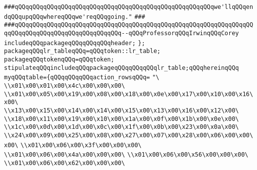 \verb|###qQQqqQQqqQQqqQQqqQQqqQQqqQQqqQQqqQQqqQQqqQQqqQQqqQQqqQQqwe'llqQQqendqQQqupqQQqwhereqQQqwe'reqQQqgoing."|\newline
\verb|###|\newline
\verb|###qQQqqQQqqQQqqQQqqQQqqQQqqQQqqQQqqQQqqQQqqQQqqQQqqQQqqQQqqQQqqQQqqQQqqQQqqQQqqQQqqQQqqQQqqQQqqQQqqQQq--qQQqProfessorqQQqIrwinqQQqCorey|\newline
\newline
\newline
\newline
\verb|includeqQQqpackageqQQqqQQqqQQqheader;|\newline
\newline
\verb|};|\newline
\verb|packageqQQqlr_tableqQQq=qQQqtoken::lr_table;|\newline
\verb|packageqQQqtokenqQQq=qQQqtoken;|\newline
\verb|stipulateqQQqincludeqQQqpackageqQQqqQQqqQQqlr_table;qQQqhereinqQQq|\newline
\verb|myqQQqtable={qQQqqQQqqQQqaction_rowsqQQq=|\newline
\verb|"\|\newline
\verb|\\x01\x00\x01\x00\x4c\x00\x00\x00\|\newline
\verb|\\x01\x00\x05\x00\x19\x00\x08\x00\x18\x00\x0e\x00\x17\x00\x10\x00\x16\x00\|\newline
\verb|\\x13\x00\x15\x00\x14\x00\x14\x00\x15\x00\x13\x00\x16\x00\x12\x00\|\newline
\verb|\\x18\x00\x11\x00\x19\x00\x10\x00\x1a\x00\x0f\x00\x1b\x00\x0e\x00\|\newline
\verb|\\x1c\x00\x0d\x00\x1d\x00\x0c\x00\x1f\x00\x0b\x00\x23\x00\x0a\x00\|\newline
\verb|\\x24\x00\x09\x00\x25\x00\x08\x00\x27\x00\x07\x00\x28\x00\x06\x00\x00\x00\|\newline
\verb|\\x01\x00\x06\x00\x3f\x00\x00\x00\|\newline
\verb|\\x01\x00\x06\x00\x4a\x00\x00\x00\|\newline
\verb|\\x01\x00\x06\x00\x56\x00\x00\x00\|\newline
\verb|\\x01\x00\x06\x00\x62\x00\x00\x00\|\newline
